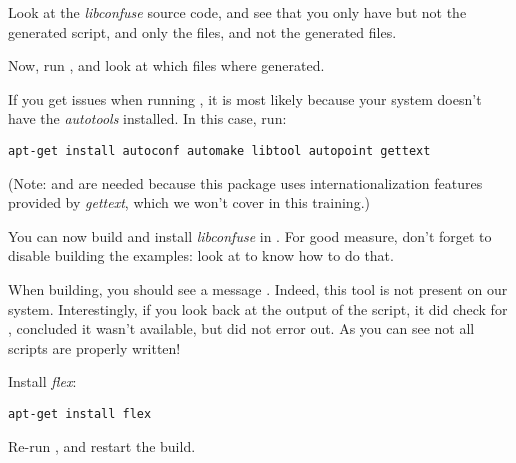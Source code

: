Look at the {\em libconfuse} source code, and see that you only have
 but not the generated  script, and
only the  files, and not the generated
 files.

Now, run , and look at which files where
generated.

If you get issues when running , it is most likely
because your system doesn't have the {\em autotools} installed. In
this case, run:

\begin{verbatim}
apt-get install autoconf automake libtool autopoint gettext
\end{verbatim}

(Note:  and  are needed because this
package uses internationalization features provided by {\em gettext},
which we won't cover in this training.)

You can now build and install {\em libconfuse} in
. For good measure, don't forget to disable building
the examples: look at  to know how to do
that.

When building, you should see a message . Indeed, this tool is not present on our
system. Interestingly, if you look back at the output of the
 script, it did check for , concluded it
wasn't available, but did not error out. As you can see not all
 scripts are properly written!

Install {\em flex}:

\begin{verbatim}
apt-get install flex
\end{verbatim}

Re-run , and restart the build.

